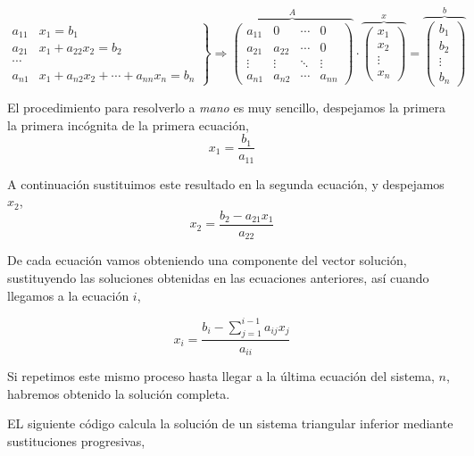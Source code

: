 \begin{equation*}
\left. \begin{aligned}
a_{11}&x_1=b_1\\
a_{21}&x_1+a_{22}x_2=b_2\\
\cdots & \\
a_{n1}&x_1+a_{n2}x_2+\cdots +a_{nn}x_n=b_n
\end{aligned}\right\} \Rightarrow	\overbrace{\begin{pmatrix}
a_{11}& 0& \cdots & 0\\
a_{21}& a_{22}& \cdots & 0\\
\vdots & \vdots & \ddots & \vdots\\
a_{n1}& a_{n2}& \cdots & a_{nn}
\end{pmatrix}}^A \cdot \overbrace{\begin{pmatrix}
x_1\\
x_2\\
\vdots \\
x_n
\end{pmatrix}}^x=\overbrace{\begin{pmatrix}
b_1\\
b_2\\
\vdots \\
b_n
\end{pmatrix}}^b
\end{equation*}

El procedimiento para resolverlo a \emph{mano} es muy sencillo,
despejamos la primera la primera incógnita de la primera ecuación,
\begin{equation*}
x_1=\frac{b_1}{a_{11}}
\end{equation*}

A continuación sustituimos este resultado en la segunda ecuación, y despejamos $x_2$,
\begin{equation*}
x_2=\frac{b_2-a_{21}x_1}{a_{22}}
\end{equation*}

De cada ecuación vamos obteniendo una componente del vector solución, sustituyendo las soluciones obtenidas en las ecuaciones anteriores, así cuando llegamos a la ecuación $i$,

\begin{equation*}
x_i=\frac{b_i-\sum_{j=1}^{i-1}a_{ij}x_j}{a_{ii}}
\end{equation*}

Si repetimos este mismo proceso hasta llegar a la última ecuación del sistema, $n$, habremos obtenido la solución completa.

EL siguiente código calcula la solución de un sistema triangular inferior mediante sustituciones progresivas,


